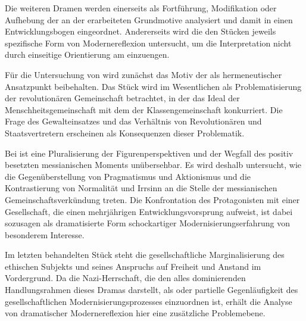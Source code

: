 
Die weiteren Dramen werden einerseits als Fortführung, Modifikation
oder Aufhebung der an der  erarbeiteten Grundmotive
analysiert und damit in einen Entwicklungsbogen eingeordnet.
Andererseits wird die den Stücken jeweils spezifische Form von
Modernereflexion untersucht, um die Interpretation nicht durch
einseitige Orientierung am \Cite{messianischen Expressionismus}
einzuengen.

Für die Untersuchung von  wird zunächst das
Motiv der  als hermeneutischer Ansatzpunkt
beibehalten. Das Stück wird im Wesentlichen als Problematisierung
der revolutionären Gemeinschaft betrachtet, in der das Ideal der
Menschheitsgemeinschaft mit dem der Klassengemeinschaft konkurriert.
Die Frage des Gewalteinsatzes und das Verhältnis von Revolutionären und
Staatsvertretern erscheinen als Konsequenzen dieser Problematik.

Bei  ist eine Pluralisierung der
Figurenperspektiven und der Wegfall des positiv besetzten
messianischen Moments unübersehbar. Es wird deshalb untersucht, wie die
Gegenüberstellung von Pragmatismus und Aktionismus und die Kontrastierung von
Normalität und Irrsinn an die Stelle der messianischen Gemeinschaftsverkündung
treten. Die Konfrontation des Protagonisten mit einer Gesellschaft, die
einen mehrjährigen Entwicklungsvorsprung aufweist, ist dabei sozusagen
als dramatisierte Form schockartiger Modernisierungserfahrung von
besonderem Interesse.

Im letzten behandelten Stück  steht die gesellschaftliche
Marginalisierung des ethischen Subjekts und seines Anspruchs auf
Freiheit und Anstand im Vordergrund. Da die Nazi-Herrschaft, die den
alles dominierenden Handlungsrahmen dieses Dramas darstellt, als
\Cite{Verwerfung} oder partielle Gegenläufigkeit des gesellschaftlichen
Modernisierungsprozesses einzuordnen ist, erhält die Analyse von
dramatischer Modernereflexion hier eine zusätzliche Problemebene.  


